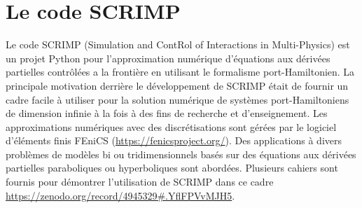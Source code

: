 \documentclass[12pt, french]{article}
\begin{document}
	\section{Le code SCRIMP}\label{sec:SCRIMP}
Le code SCRIMP (Simulation and ContRol of Interactions in Multi-Physics) est un projet Python pour l'approximation numérique d'équations aux dérivées partielles contrôlées a la frontière en utilisant le formalisme port-Hamiltonien. La principale motivation derrière le développement de SCRIMP était de fournir un cadre facile à utiliser pour la solution numérique de systèmes port-Hamiltoniens de dimension infinie à la fois à des fins de recherche et d'enseignement. Les approximations numériques avec des discrétisations sont gérées par le logiciel d'éléments finis FEniCS (\url{https://fenicsproject.org/}). Des applications à divers problèmes de modèles bi ou tridimensionnels basés sur des équations aux dérivées partielles paraboliques ou hyperboliques sont abordées. Plusieurs cahiers sont fournis pour démontrer l'utilisation de SCRIMP dans ce cadre \url{https://zenodo.org/record/4945329\#.YflFPVvMJH5}.
	
	
	
	
	
\end{document}
